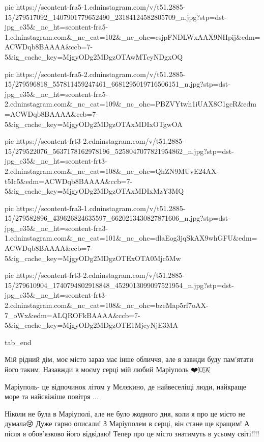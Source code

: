      pic https://scontent-fra5-1.cdninstagram.com/v/t51.2885-15/279517092_1407901779652490_23184124582805709_n.jpg?stp=dst-jpg_e35&_nc_ht=scontent-fra5-1.cdninstagram.com&_nc_cat=102&_nc_ohc=csjpFNDLWxAAX9NHpij&edm=ACWDqb8BAAAA&ccb=7-5&ig_cache_key=MjgyODg2MDgzOTAwMTcyNDgxOQ%

     pic https://scontent-fra5-2.cdninstagram.com/v/t51.2885-15/279596818_557811459247461_6681295019716506151_n.jpg?stp=dst-jpg_e35&_nc_ht=scontent-fra5-2.cdninstagram.com&_nc_cat=109&_nc_ohc=PBZVYtwh1iUAX8C1gcR&edm=ACWDqb8BAAAA&ccb=7-5&ig_cache_key=MjgyODg2MDgzOTAxMDIxOTgwOA%

     pic https://scontent-frt3-2.cdninstagram.com/v/t51.2885-15/279522076_5637178162978196_5258047077821954862_n.jpg?stp=dst-jpg_e35&_nc_ht=scontent-frt3-2.cdninstagram.com&_nc_cat=108&_nc_ohc=QhZN9MUvE24AX-t5Ic5&edm=ACWDqb8BAAAA&ccb=7-5&ig_cache_key=MjgyODg2MDgzOTAxMDIxMzY3MQ%

     pic https://scontent-fra3-1.cdninstagram.com/v/t51.2885-15/279582896_439626824635597_6620213430827871606_n.jpg?stp=dst-jpg_e35&_nc_ht=scontent-fra3-1.cdninstagram.com&_nc_cat=101&_nc_ohc=dlaEog3jqSkAX9whGFU&edm=ACWDqb8BAAAA&ccb=7-5&ig_cache_key=MjgyODg2MDgzOTExOTA0Mjc5Mw%

     pic https://scontent-frt3-2.cdninstagram.com/v/t51.2885-15/279610904_1740794802918848_4529013099097521954_n.jpg?stp=dst-jpg_e35&_nc_ht=scontent-frt3-2.cdninstagram.com&_nc_cat=108&_nc_ohc=bzeMap5rf7oAX-7_oWx&edm=ALQROFkBAAAA&ccb=7-5&ig_cache_key=MjgyODg2MDgzOTE1MjcyNjE3MA%

  tab_end
\fi


Мій рідний дім, моє місто зараз має інше обличчя, але я завжди буду пам'ятати
його таким.  Назавжди в моєму серці мій любий Маріуполь ❤️🇺🇦


Маріуполь- це відпочинок літом у Мєлєкино, де найвеселіщі люди, найкраще море
та найсвіжіше повітря ...


Ніколи не була в Маріуполі, але не було жодного дня, коли я про це місто не
думала😢 Дуже гарно описали! З Маріуполем в серці, він стане ще кращим! А після
я обов’язково його відвідаю! Тепер про це місто знатимуть в усьому
світі!!!!💙💛
